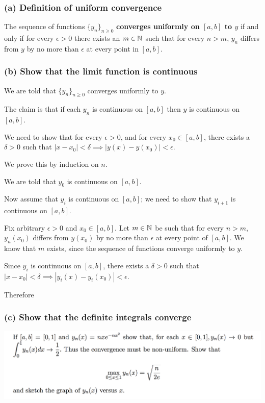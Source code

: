 \documentclass[12pt]{article}
\begin{document}
\begin{mdframed}
  \subsubsection*{(a) Definition of uniform convergence}
  The sequence of functions $\{y_n\}_{n\geq 0}$ \textbf{converges uniformly on
    $[a, b]$ to $y$} if and only if for every $\epsilon > 0$ there exists an
  $m \in \mathbb{N}$ such that for every $n > m$, $y_n$ differs from $y$ by no more
  than $\epsilon$ at every point in $[a,b]$.

  \subsubsection*{(b) Show that the limit function is continuous}

  We are told that $\{y_n\}_{n \geq 0}$ converges uniformly to $y$.

  The claim is that if each $y_n$ is continuous on $[a,b]$ then $y$ is
  continuous on $[a,b]$.

  We need to show that for every $\epsilon > 0$, and for every
  $x_0 \in [a, b]$, there exists a $\delta > 0$ such that
  $|x - x_0| < \delta \implies |y(x) - y(x_0)| < \epsilon$.



  We prove this by induction on $n$.

  We are told that $y_0$ is continuous on $[a,b]$.

  Now assume that $y_i$ is continuous on $[a,b]$; we need to show that
  $y_{i+1}$ is continuous on $[a,b]$.

  Fix arbitrary $\epsilon > 0$ and $x_0 \in [a,b]$. Let $m \in \mathbb{N}$ be such that
  for every $n > m$, $y_n(x_0)$ differs from $y(x_0)$ by no more than
  $\epsilon$ at every point of $[a,b]$. We know that $m$ exists, since the
  sequence of functions converge uniformly to $y$.

  Since $y_i$ is continuous on $[a,b]$, there exists a $\delta > 0$ such that
  $|x - x_0| < \delta \implies |y_i(x) - y_i(x_0)| < \epsilon$.

  Therefore

  \subsubsection*{(c) Show that the definite integrals converge}

\end{mdframed}

\newpage
\includegraphics[width=450pt]{img/differential-equations-a1-1-1-b.png}\\
\begin{mdframed}
\end{mdframed}
\end{document}
